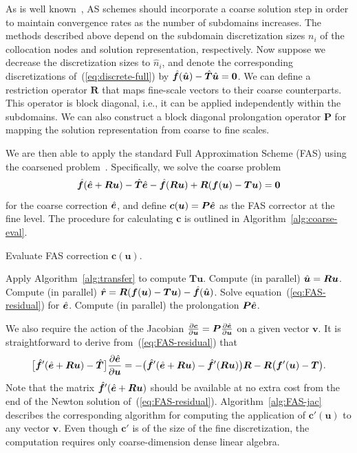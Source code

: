 As is well known~\cite{Dolean2015}, AS schemes should incorporate a coarse solution step in order to maintain convergence rates as the number of subdomains increases. The methods described above depend on the subdomain discretization sizes $n_i$ of the collocation nodes and solution representation, respectively. Now suppose we decrease the discretization sizes to $\hat{n}_i$, and denote the corresponding discretizations of~(\ref{eq:discrete-full}) by $\hat{\bm{f}}(\hat{\bm{u}}) - \hat{\bm{T}}\hat{\bm{u}} = \bm{0}$.  We can define a restriction operator $\bm{R}$ that maps fine-scale vectors to their coarse counterparts. This operator is block diagonal, i.e., it can be applied independently within the subdomains. We can also construct a block diagonal prolongation operator $\bm{P}$ for mapping the solution representation from coarse to fine scales. 

We are then able to apply the standard Full Approximation Scheme (FAS) using the coarsened problem~\cite{Brandt2011}. Specifically, we solve the coarse problem 
\begin{equation}
  \label{eq:FAS-residual}
  \hat{\bm{f}}( \hat{\bm{e}} + \bm{R}\bm{u} ) - \hat{\bm{T}}\hat{\bm{e}} - \hat{\bm{f}}(\bm{R}\bm{u}) + \bm{R} ( \bm{f}(\bm{u}) - \bm{T}\bm{u} ) = \bm{0} 
\end{equation}
for the coarse correction $\hat{\bm{e}}$, and define $\bm{c}(\bm{u})=\bm{P}\hat{\bm{e}}$ as the FAS corrector at the fine level. The procedure for calculating $\bm{c}$ is outlined in Algorithm~\ref{alg:coarse-eval}.

\begin{algorithm}[tbp]
  \caption{Evaluate FAS correction $\bm{c}(\bm{u})$.}
  \label{alg:coarse-eval}
  \begin{algorithmic}
    \STATE Apply Algorithm~\ref{alg:transfer} to compute $\bm{T}\bm{u}$.
    \STATE Compute (in parallel) $\hat{\bm{u}} = \bm{R} \bm{u}$.
    \STATE Compute (in parallel)  $\hat{\bm{r}} = \bm{R}( \bm{f}(\bm{u}) - \bm{T}\bm{u} ) - \hat{\bm{f}}(\hat{\bm{u}})$. 
    \STATE Solve equation~(\ref{eq:FAS-residual}) for $\hat{\bm{e}}$.
    \STATE Compute (in parallel) the prolongation $\bm{P} \hat{\bm{e}}$. 
  \end{algorithmic}
\end{algorithm}


We also require the action of the Jacobian $\frac{\partial \bm{c}}{\partial \bm{u}}=\bm{P} \frac{\partial \hat{\bm{e}}}{\partial \bm{u}}$ on a given vector $\bm{v}$. It is straightforward to derive from~(\ref{eq:FAS-residual}) that
\begin{equation}
  \label{eq:FAS-jac}
   \bigl[ \hat{\bm{f}}'( \hat{\bm{e}} + \bm{R}\bm{u} ) -\hat{\bm{T}} \bigr] \frac{\partial \hat{\bm{e}}}{\partial \bm{u}}  = 
    -\bigl( \hat{\bm{f}}'(\hat{\bm{e}} + \bm{R}\bm{u}) - \hat{\bm{f}}'(\bm{R} \bm{u}) \bigr)\bm{R}
    - \bm{R} \bigl( \bm{f}'(\bm{u}) - \bm{T} \bigr).
  \end{equation}
Note that the matrix $\hat{\bm{f}}'( \hat{\bm{e}} + \bm{R}\bm{u} )$ should be available at no extra cost from the end of the Newton solution of~(\ref{eq:FAS-residual}). Algorithm~\ref{alg:FAS-jac} describes the corresponding algorithm for computing the application of $\bm{c}'(\bm{u})$ to any vector $\bm{v}$. Even though $\bm{c}'$ is of the size of the fine discretization, the computation requires only coarse-dimension dense linear algebra. 

